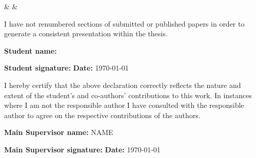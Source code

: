 {\begin{center}
\begin{NiceTabular}[colortbl-like]
        \hline
         & 
         & 
        \hline
    \end{NiceTabular}
\end{center}

I have not renumbered sections of submitted or published papers in order to generate a consistent presentation within the thesis.

\textbf{Student name:} \printThesisAuthor

\ddmmyyyydate

\textbf{Student signature:}\hspace{3mm}%
\hfill%
\textbf{Date:} \today

I hereby certify that the above declaration correctly reflects the nature and extent of the student's and co-authors' contributions to this work. In instances where I am not the responsible author I have consulted with the responsible author to agree on the respective contributions of the authors.

\textbf{Main Supervisor name:} NAME

\textbf{Main Supervisor signature:}\hspace{3mm}%
\hfill%
\textbf{Date:} \today


}